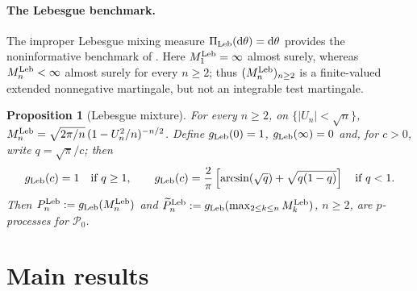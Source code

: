 \documentclass{article}
\newtheorem{proposition}{Proposition}
\begin{document}
\paragraph{The Lebesgue benchmark.}
The improper Lebesgue mixing measure $\Pi_{\mathrm{Leb}}(\mathrm{d}\theta)=\mathrm{d}\theta$
provides the noninformative benchmark of \citet{Lai1976,Wang2025}. Here
$M_1^{\mathrm{Leb}}=\infty$ almost surely, whereas $M_n^{\mathrm{Leb}}<\infty$ almost
surely for every $n\geq2$; thus $(M_n^{\mathrm{Leb}})_{n\geq2}$ is a
finite-valued extended nonnegative martingale, but not an integrable test
martingale.

\begin{proposition}[Lebesgue mixture]
\label{prop:Mn-Leb}
For every $n\geq2$, on $\{|U_n|<\sqrt n\}$,
$M_n^{\mathrm{Leb}}=\sqrt{2\pi/n}\,(1-U_n^2/n)^{-n/2}$. Define $g_{\mathrm{Leb}}(0)=1$,
$g_{\mathrm{Leb}}(\infty)=0$ and, for $c>0$, write $q=\sqrt\pi/c$; then
\begin{equation}
\label{eq:g-Leb}
  g_{\mathrm{Leb}}(c)=1 \quad\text{if } q\geq1,
  \qquad
  g_{\mathrm{Leb}}(c)
  =\frac{2}{\pi}\left[\arcsin\!\left(\sqrt q\right)+\sqrt{q(1-q)}\right]
  \quad\text{if } q<1 .
\end{equation}
Then $P_n^{\mathrm{Leb}}:=g_{\mathrm{Leb}}(M_n^{\mathrm{Leb}})$ and
$\widetilde P_n^{\mathrm{Leb}}:=g_{\mathrm{Leb}}(\max_{2\leq k\leq n}M_k^{\mathrm{Leb}})$,
$n\geq2$, are $p$-processes for $\mathcal P_0$.
\end{proposition}



\section{Main results}
\label{sec:mainresult}
\vspace{-4pt}
\end{document}

